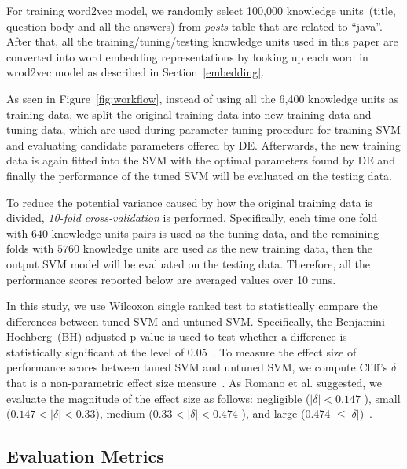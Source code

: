 \documentclass[sigconf]{acmart}
\theoremstyle{break}
\newcommand{\fig}[1]{Figure~\ref{fig:#1}}
\begin{document}
For training word2vec model, we randomly select 100,000 knowledge
 units~(title, question body and all the answers) from {\it posts} table that are
 related to ``java''. After that, all the training/tuning/testing knowledge units
 used in this paper are converted into word embedding representations by looking up
 each word in wrod2vec model as described in Section~\ref{embedding}.
 
As seen in \fig{workflow}, instead of using all the 6,400 knowledge units as training data, 
we split the original training data into { new training data} and {tuning data}, which are
used during parameter tuning procedure for training SVM and evaluating candidate
parameters offered by DE. Afterwards, the {new training} data is again fitted into the SVM
with the optimal parameters found by DE and finally  the performance of the tuned
SVM will be evaluated on the {testing data}.

To reduce the potential variance caused
by how the original training data is divided, {\it 10-fold cross-validation} is performed. Specifically, 
each time one fold with $640$ knowledge units pairs is used as the tuning data, and the remaining folds with $5760$
knowledge units are used as  the new training data, then the output SVM model will be evaluated on the testing data. Therefore,
all the performance scores reported below are averaged values over 10 runs.


In this study, we use Wilcoxon single ranked test to statistically compare
the differences between tuned SVM and untuned SVM.
Specifically, the Benjamini-Hochberg~(BH) adjusted p-value 
is used to test whether a difference is statistically significant
at the level of $0.05$~\cite{benjamini1995controlling}. 
To measure the effect size of performance scores between tuned SVM and untuned SVM,
we compute Cliff's $\delta$ that is a non-parametric effect size measure~\cite{romano2006exploring}.
As Romano et al. suggested, we evaluate the magnitude of the effect size as follows:
negligible ($|\delta|<0.147$ ), small ($ 0.147<|\delta|<0.33$), medium ($0.33<|\delta|<0.474$ ), and large (0.474 $\leq|\delta|$)~\cite{romano2006exploring}.



\subsection{Evaluation Metrics}
\end{document}
